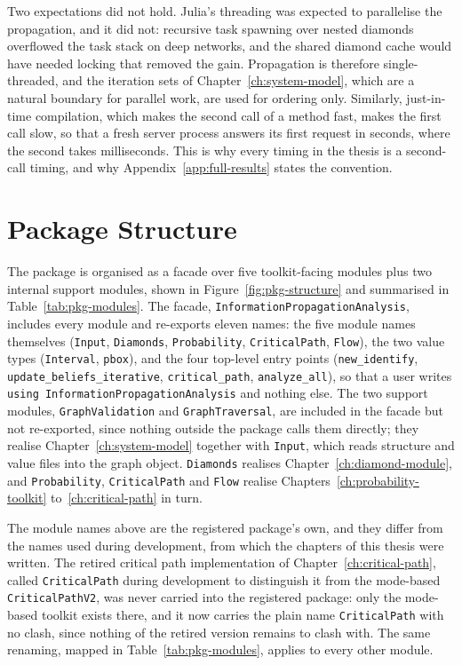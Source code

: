 \documentclass[12pt]{report}
\begin{document}
Two expectations did not hold. Julia's threading was expected to parallelise the
propagation, and it did not: recursive task spawning over nested diamonds overflowed the
task stack on deep networks, and the shared diamond cache would have needed locking that
removed the gain. Propagation is therefore single-threaded, and the iteration sets of
Chapter~\ref{ch:system-model}, which are a natural boundary for parallel work, are used for
ordering only. Similarly, just-in-time compilation, which makes the second call of a method fast,
makes the first call slow, so that a fresh server process answers its first request in
seconds, where the second takes milliseconds. This is why every timing in the thesis is a second-call
timing, and why Appendix~\ref{app:full-results} states the convention.

\section{Package Structure}
\label{sec:pkg-structure}

The package is organised as a facade over five toolkit-facing modules plus two internal
support modules, shown in Figure~\ref{fig:pkg-structure} and summarised in
Table~\ref{tab:pkg-modules}. The facade, \texttt{InformationPropagationAnalysis}, includes
every module and re-exports eleven names: the five module names themselves
(\texttt{Input}, \texttt{Diamonds}, \texttt{Probability}, \texttt{CriticalPath},
\texttt{Flow}), the two value types (\texttt{Interval}, \texttt{pbox}), and the four
top-level entry points (\texttt{new\_identify}, \texttt{update\_beliefs\_iterative},
\texttt{critical\_path}, \texttt{analyze\_all}), so that a user writes
\texttt{using InformationPropagationAnalysis} and nothing else. The two support modules,
\texttt{GraphValidation} and \texttt{GraphTraversal}, are included in the facade but not
re-exported, since nothing outside the package calls them directly; they realise
Chapter~\ref{ch:system-model} together with \texttt{Input}, which reads structure and
value files into the graph object. \texttt{Diamonds} realises
Chapter~\ref{ch:diamond-module}, and \texttt{Probability}, \texttt{CriticalPath} and
\texttt{Flow} realise Chapters~\ref{ch:probability-toolkit} to~\ref{ch:critical-path} in
turn.

The module names above are the registered package's own, and they differ from the names
used during development, from which the chapters of this thesis were written. The
retired critical path implementation of Chapter~\ref{ch:critical-path}, called
\texttt{CriticalPath} during development to distinguish it from the mode-based
\texttt{CriticalPathV2}, was never carried into the registered package: only the
mode-based toolkit exists there, and it now carries the plain name \texttt{CriticalPath}
with no clash, since nothing of the retired version remains to clash with. The same
renaming, mapped in Table~\ref{tab:pkg-modules}, applies to every other module.
\end{document}
